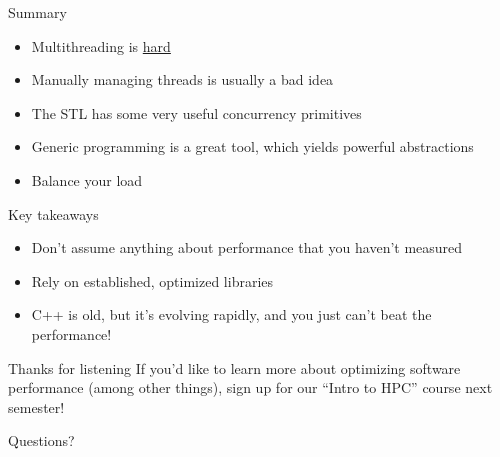 \documentclass{beamer}
\begin{document}
\begin{frame}{Summary}
\begin{itemize}
\setlength\itemsep{.5em}
\item Multithreading is \underline{hard}
\item Manually managing threads is usually a bad idea
\item The STL has some very useful concurrency primitives
\item Generic programming is a great tool, which yields powerful abstractions
\item Balance your load
\end{itemize}
\end{frame}

\begin{frame}{Key takeaways}
\Large
\begin{itemize}
\setlength\itemsep{1em}
\item[\rightarrow] Don't assume anything about performance that you haven't measured
\item[\rightarrow] Rely on established, optimized libraries
\item[\rightarrow] C++ is old, but it's evolving rapidly, and you just can't beat the performance!
\end{itemize}
\end{frame}

\appendix
\begin{frame}{Thanks for listening}
\Large
If you'd like to learn more about optimizing software performance (among other things), sign up for our ``Intro to HPC'' course next semester!

\vfill
Questions?
\end{frame}
\end{document}
